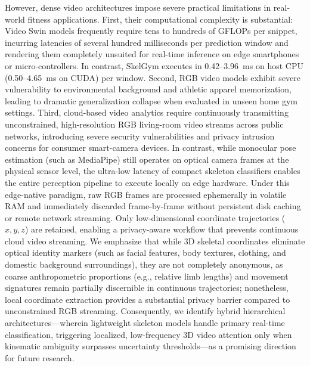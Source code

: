 \documentclass[runningheads]{llncs}
\begin{document}
However, dense video architectures impose severe practical limitations in real-world fitness applications. First, their computational complexity is substantial: Video Swin models frequently require tens to hundreds of GFLOPs per snippet, incurring latencies of several hundred milliseconds per prediction window and rendering them completely unsuited for real-time inference on edge smartphones or micro-controllers. In contrast, SkelGym executes in 0.42--3.96~ms on host CPU (0.50--4.65~ms on CUDA) per window. Second, RGB video models exhibit severe vulnerability to environmental background and athletic apparel memorization, leading to dramatic generalization collapse when evaluated in unseen home gym settings. Third, cloud-based video analytics require continuously transmitting unconstrained, high-resolution RGB living-room video streams across public networks, introducing severe security vulnerabilities and privacy intrusion concerns for consumer smart-camera devices. In contrast, while monocular pose estimation (such as MediaPipe) still operates on optical camera frames at the physical sensor level, the ultra-low latency of compact skeleton classifiers enables the entire perception pipeline to execute locally on edge hardware. Under this edge-native paradigm, raw RGB frames are processed ephemerally in volatile RAM and immediately discarded frame-by-frame without persistent disk caching or remote network streaming. Only low-dimensional coordinate trajectories ($x, y, z$) are retained, enabling a privacy-aware workflow that prevents continuous cloud video streaming. We emphasize that while 3D skeletal coordinates eliminate optical identity markers (such as facial features, body textures, clothing, and domestic background surroundings), they are not completely anonymous, as coarse anthropometric proportions (e.g., relative limb lengths) and movement signatures remain partially discernible in continuous trajectories; nonetheless, local coordinate extraction provides a substantial privacy barrier compared to unconstrained RGB streaming. Consequently, we identify hybrid hierarchical architectures---wherein lightweight skeleton models handle primary real-time classification, triggering localized, low-frequency 3D video attention only when kinematic ambiguity surpasses uncertainty thresholds---as a promising direction for future research.
\end{document}
